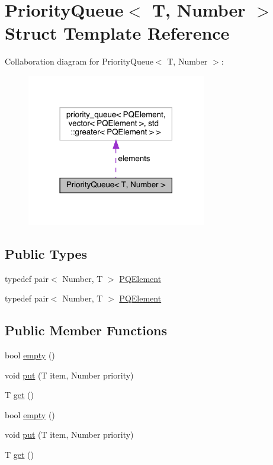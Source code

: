 \hypertarget{struct_priority_queue}{}\section{Priority\+Queue$<$ T, Number $>$ Struct Template Reference}
\label{struct_priority_queue}


Collaboration diagram for Priority\+Queue$<$ T, Number $>$\+:\nopagebreak
\begin{figure}[H]
\begin{center}
\leavevmode
\includegraphics[width=222pt]{struct_priority_queue__coll__graph}
\end{center}
\end{figure}
\subsection*{Public Types}
\begin{DoxyCompactItemize}
\item 
typedef pair$<$ Number, T $>$ \hyperlink{struct_priority_queue_ae86a19aae3f9a32a1d76dfdab34eb70b}{P\+Q\+Element}
\item 
typedef pair$<$ Number, T $>$ \hyperlink{struct_priority_queue_ae86a19aae3f9a32a1d76dfdab34eb70b}{P\+Q\+Element}
\end{DoxyCompactItemize}
\subsection*{Public Member Functions}
\begin{DoxyCompactItemize}
\item 
bool \hyperlink{struct_priority_queue_a422e38d0c3b8398dc6e4867bb4ceec41}{empty} ()
\item 
void \hyperlink{struct_priority_queue_a9361c94664b98a15a91a595d65c9846c}{put} (T item, Number priority)
\item 
T \hyperlink{struct_priority_queue_ab211c9583fda5c1a6352021444af5f0e}{get} ()
\item 
bool \hyperlink{struct_priority_queue_a422e38d0c3b8398dc6e4867bb4ceec41}{empty} ()
\item 
void \hyperlink{struct_priority_queue_a9361c94664b98a15a91a595d65c9846c}{put} (T item, Number priority)
\item 
T \hyperlink{struct_priority_queue_ab211c9583fda5c1a6352021444af5f0e}{get} ()
\end{DoxyCompactItemize}

